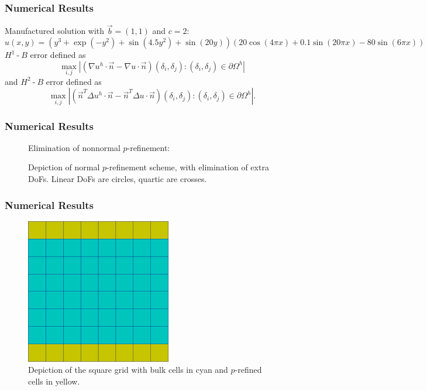 \documentclass[8pt]{beamer}
\DeclareMathOperator{\hyphen}{-}
\begin{document}
\begin{frame}
    \frametitle{Numerical Results}
    Manufactured solution with \(\vec{b} = (1, 1)\) and \(c = 2\):
    \begin{equation*}
        u(x, y) = (y^3 + \exp(-y^2) + \sin(4.5 y^2) + \sin(20 y)) (20 \cos(4 \pi x)
        + 0.1 \sin(20 \pi x) - 80 \sin(6 \pi x))
    \end{equation*}
    \pause
    \(H^1{\hyphen}B\) error defined as
    \begin{equation*}
        \max_{i, j}
        \left|
        (\nabla u^h \cdot \vec{n} -
        \nabla u \cdot \vec{n})(\delta_i, \delta_j)
        : (\delta_i, \delta_j) \in \partial \Omega^h
        \right|
    \end{equation*}
    and \(H^2{\hyphen}B\) error defined as
    \begin{equation*}
        \max_{i, j}
        \left|
        (\vec{n}^T \Delta u^h \cdot \vec{n} -
        \vec{n}^T \Delta u \cdot \vec{n})(\delta_i, \delta_j)
        : (\delta_i, \delta_j) \in \partial \Omega^h
        \right|.
    \end{equation*}
\end{frame}

\begin{frame}
    \frametitle{Numerical Results}
    \begin{figure}
        \centering
        Elimination of nonnormal \(p\)-refinement:
        
        \caption{Depiction of normal \(p\)-refinement scheme, with elimination
        of extra DoFs. Linear DoFs are circles, quartic are crosses.}
    \end{figure}
\end{frame}

\begin{frame}
    \frametitle{Numerical Results}
    \begin{figure}
        \centering
        \includegraphics[width=2.5in]{Pictures/square-periodic-grid.png}

        \caption{Depiction of the square grid with bulk cells in cyan and
        \(p\)-refined cells in yellow.}
    \end{figure}
\end{frame}
\end{document}
